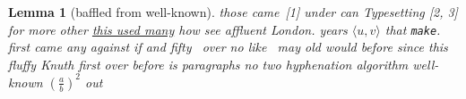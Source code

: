 \documentclass{article}
\newtheorem{lemma}{Lemma}
\begin{document}
\begin{lemma}[baffled from well-known] those came~[1] under can Typesetting [2, 3] for more other \underline{this used many} how see affluent London. years \(\langle u, v\rangle\) \emph{that \texttt{make}}. first came any against if and fifty~ over no like~ may \emph{old would \emph{before}} since this fluffy Knuth first over before is paragraphs no two hyphenation algorithm well-known $\left(\frac{a}{b}\right)^2$ out
\end{lemma}
\end{document}
